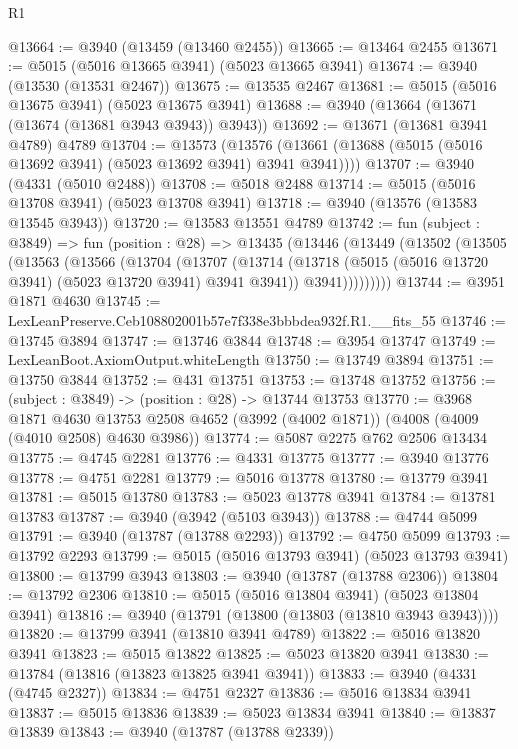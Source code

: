\begin{lexlean}{R1}
\begin{coremodule}
@13664 := @3940 (@13459 (@13460 @2455))
@13665 := @13464 @2455
@13671 := @5015 (@5016 @13665 @3941) (@5023 @13665 @3941)
@13674 := @3940 (@13530 (@13531 @2467))
@13675 := @13535 @2467
@13681 := @5015 (@5016 @13675 @3941) (@5023 @13675 @3941)
@13688 := @3940 (@13664 (@13671 (@13674 (@13681 @3943 @3943)) @3943))
@13692 := @13671 (@13681 @3941 @4789) @4789
@13704 := @13573
    (@13576 (@13661 (@13688 (@5015 (@5016 @13692 @3941) (@5023 @13692 @3941) @3941 @3941))))
@13707 := @3940 (@4331 (@5010 @2488))
@13708 := @5018 @2488
@13714 := @5015 (@5016 @13708 @3941) (@5023 @13708 @3941)
@13718 := @3940 (@13576 (@13583 @13545 @3943))
@13720 := @13583 @13551 @4789
@13742 := fun (subject : @3849) =>
  fun (position : @28) =>
  @13435
    (@13446
      (@13449
        (@13502
          (@13505
            (@13563
              (@13566
                (@13704
                  (@13707
                    (@13714
                      (@13718 (@5015 (@5016 @13720 @3941) (@5023 @13720 @3941) @3941 @3941))
                      @3941)))))))))
@13744 := @3951 @1871 @4630
@13745 := LexLeanPreserve.Ceb108802001b57e7f338e3bbbdea932f.R1.__fits_55
@13746 := @13745 @3894
@13747 := @13746 @3844
@13748 := @3954 @13747
@13749 := LexLeanBoot.AxiomOutput.whiteLength
@13750 := @13749 @3894
@13751 := @13750 @3844
@13752 := @431 @13751
@13753 := @13748 @13752
@13756 := (subject : @3849) -> (position : @28) -> @13744 @13753
@13770 := @3968
    @1871
    @4630
    @13753
    @2508
    @4652
    (@3992 (@4002 @1871))
    (@4008 (@4009 (@4010 @2508) @4630 @3986))
@13774 := @5087 @2275 @762 @2506 @13434
@13775 := @4745 @2281
@13776 := @4331 @13775
@13777 := @3940 @13776
@13778 := @4751 @2281
@13779 := @5016 @13778
@13780 := @13779 @3941
@13781 := @5015 @13780
@13783 := @5023 @13778 @3941
@13784 := @13781 @13783
@13787 := @3940 (@3942 (@5103 @3943))
@13788 := @4744 @5099
@13791 := @3940 (@13787 (@13788 @2293))
@13792 := @4750 @5099
@13793 := @13792 @2293
@13799 := @5015 (@5016 @13793 @3941) (@5023 @13793 @3941)
@13800 := @13799 @3943
@13803 := @3940 (@13787 (@13788 @2306))
@13804 := @13792 @2306
@13810 := @5015 (@5016 @13804 @3941) (@5023 @13804 @3941)
@13816 := @3940 (@13791 (@13800 (@13803 (@13810 @3943 @3943))))
@13820 := @13799 @3941 (@13810 @3941 @4789)
@13822 := @5016 @13820 @3941
@13823 := @5015 @13822
@13825 := @5023 @13820 @3941
@13830 := @13784 (@13816 (@13823 @13825 @3941 @3941))
@13833 := @3940 (@4331 (@4745 @2327))
@13834 := @4751 @2327
@13836 := @5016 @13834 @3941
@13837 := @5015 @13836
@13839 := @5023 @13834 @3941
@13840 := @13837 @13839
@13843 := @3940 (@13787 (@13788 @2339))

\end{coremodule}
\end{lexlean}
